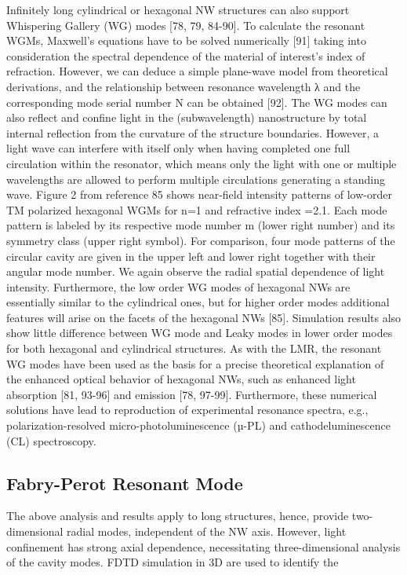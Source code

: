 Infinitely long cylindrical or hexagonal NW structures can also support
Whispering Gallery (WG) modes [78, 79, 84-90]. To calculate the resonant WGMs,
Maxwell’s equations have to be solved numerically [91] taking into
consideration the spectral dependence of the material of interest’s index of
refraction. However, we can deduce a simple plane-wave model from theoretical
derivations, and the relationship between resonance wavelength λ and the
corresponding mode serial number N can be obtained [92]. The WG modes can also
reflect and confine light in the (subwavelength) nanostructure by total
internal reflection from the curvature of the structure boundaries. However, a
light wave can interfere with itself only when having completed one full
circulation within the resonator, which means only the light with one or
multiple wavelengths are allowed to perform multiple circulations generating a
standing wave. Figure 2 from reference 85 shows near-field intensity patterns
of low-order TM polarized hexagonal WGMs for n=1 and refractive index =2.1.
Each mode pattern is labeled by its respective mode number m (lower right
number) and its symmetry class (upper right symbol).  For comparison, four mode
patterns of the circular cavity are given in the upper left and lower right
together with their angular mode number. We again observe the radial spatial
dependence of light intensity. Furthermore, the low order WG modes of hexagonal
NWs are essentially similar to the cylindrical ones, but for higher order modes
additional features will arise on the facets of the hexagonal NWs [85].
Simulation results also show little difference between WG mode and Leaky modes
in lower order modes for both hexagonal and cylindrical structures. As with the
LMR, the resonant WG modes have been used as the basis for a precise
theoretical explanation of the enhanced optical behavior of hexagonal NWs, such
as enhanced light absorption [81, 93-96] and emission [78, 97-99]. Furthermore,
these numerical solutions have lead to reproduction of experimental resonance
spectra, e.g., polarization-resolved micro-photoluminescence (µ-PL) and
cathodeluminescence (CL) spectroscopy.  \subsection{Fabry-Perot Resonant Mode}
The above analysis and results apply to long structures, hence, provide
two-dimensional radial modes, independent of the NW axis. However, light
confinement has strong axial dependence, necessitating three-dimensional
analysis of the cavity modes. FDTD simulation in 3D are used to identify the
